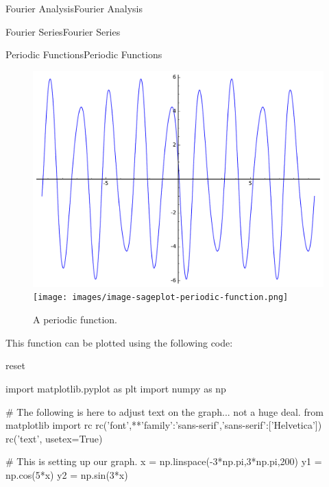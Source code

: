 \documentclass[10pt,]{book}
\numberwithin{equation}{section}
\begin{document}
\begin{chapterptx}{Fourier Analysis}{}{Fourier Analysis}{}{}
\begin{sectionptx}{Fourier Series}{}{Fourier Series}{}{}
\begin{subsectionptx}{Periodic Functions}{}{Periodic Functions}{}{}
\begin{figure}
{\includegraphics[width=1\linewidth]{images/image-sageplot-periodic-function.pdf}}%
{\texttt{[image: images/image-sageplot-periodic-function.png]}}
\caption{A periodic function.\label{figure-sageplot-periodic-function}}
\end{figure}
\hypertarget{p-378}{}%
This function can be plotted using the following code:%
\begin{sageinput}
reset

import matplotlib.pyplot as plt
import numpy as np

# The following is here to adjust text on the graph... not a huge deal.
from matplotlib import rc
rc('font',**{'family':'sans-serif','sans-serif':['Helvetica']})
rc('text', usetex=True)

# This is setting up our graph.
x = np.linspace(-3*np.pi,3*np.pi,200)
y1 = np.cos(5*x)
y2 = np.sin(3*x)


\end{sageinput}
\end{subsectionptx}
\end{sectionptx}
\end{chapterptx}
\end{document}
